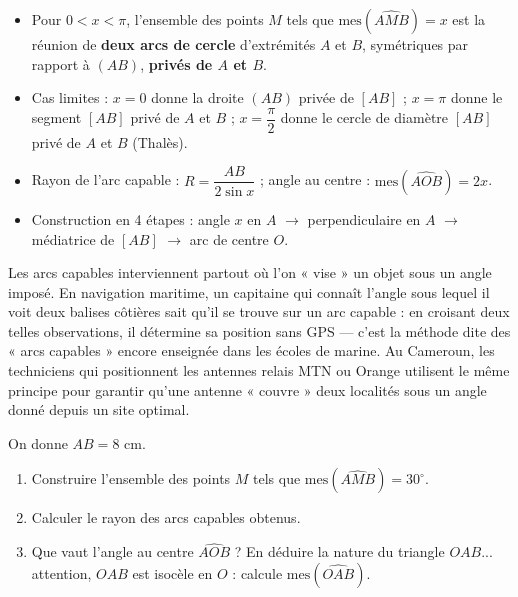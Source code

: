 \documentclass[11pt]{article}
\begin{document}
\begin{aretenir}
\begin{itemize}
\item Pour $0 < x < \pi$, l'ensemble des points $M$ tels que $\text{mes}(\widehat{AMB}) = x$ est la réunion de \textbf{deux arcs de cercle} d'extrémités $A$ et $B$, symétriques par rapport à $(AB)$, \textbf{privés de $A$ et $B$}.
\item Cas limites : $x = 0$ donne la droite $(AB)$ privée de $[AB]$ ; $x = \pi$ donne le segment $[AB]$ privé de $A$ et $B$ ; $x = \dfrac{\pi}{2}$ donne le cercle de diamètre $[AB]$ privé de $A$ et $B$ (Thalès).
\item Rayon de l'arc capable : $R = \dfrac{AB}{2\sin x}$ ; angle au centre : $\text{mes}(\widehat{AOB}) = 2x$.
\item Construction en 4 étapes : angle $x$ en $A$ $\rightarrow$ perpendiculaire en $A$ $\rightarrow$ médiatrice de $[AB]$ $\rightarrow$ arc de centre $O$.
\end{itemize}
\end{aretenir}

\begin{savaistu}
Les arcs capables interviennent partout où l'on « vise » un objet sous un angle imposé. En navigation maritime, un capitaine qui connaît l'angle sous lequel il voit deux balises côtières sait qu'il se trouve sur un arc capable : en croisant deux telles observations, il détermine sa position sans GPS — c'est la méthode dite des « arcs capables » encore enseignée dans les écoles de marine. Au Cameroun, les techniciens qui positionnent les antennes relais MTN ou Orange utilisent le même principe pour garantir qu'une antenne « couvre » deux localités sous un angle donné depuis un site optimal.
\end{savaistu}

\begin{exercice}
On donne $AB = 8$ cm. 
\begin{enumerate}
\item Construire l'ensemble des points $M$ tels que $\text{mes}(\widehat{AMB}) = 30^{\circ}$.
\item Calculer le rayon des arcs capables obtenus.
\item Que vaut l'angle au centre $\widehat{AOB}$ ? En déduire la nature du triangle $OAB$... attention, $OAB$ est isocèle en $O$ : calcule $\text{mes}(\widehat{OAB})$.
\end{enumerate}
\end{exercice}
\end{document}

